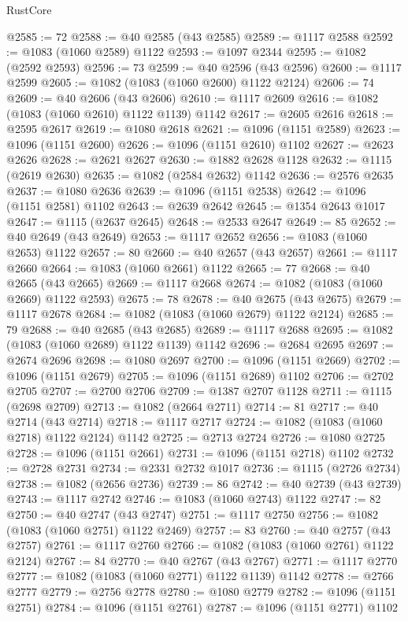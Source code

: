 \begin{lexlean}{RustCore}
\begin{coremodule}
@2585 := 72
@2588 := @40 @2585 (@43 @2585)
@2589 := @1117 @2588
@2592 := @1083 (@1060 @2589) @1122
@2593 := @1097 @2344
@2595 := @1082 (@2592 @2593)
@2596 := 73
@2599 := @40 @2596 (@43 @2596)
@2600 := @1117 @2599
@2605 := @1082 (@1083 (@1060 @2600) @1122 @2124)
@2606 := 74
@2609 := @40 @2606 (@43 @2606)
@2610 := @1117 @2609
@2616 := @1082 (@1083 (@1060 @2610) @1122 @1139) @1142
@2617 := @2605 @2616
@2618 := @2595 @2617
@2619 := @1080 @2618
@2621 := @1096 (@1151 @2589)
@2623 := @1096 (@1151 @2600)
@2626 := @1096 (@1151 @2610) @1102
@2627 := @2623 @2626
@2628 := @2621 @2627
@2630 := @1882 @2628 @1128
@2632 := @1115 (@2619 @2630)
@2635 := @1082 (@2584 @2632) @1142
@2636 := @2576 @2635
@2637 := @1080 @2636
@2639 := @1096 (@1151 @2538)
@2642 := @1096 (@1151 @2581) @1102
@2643 := @2639 @2642
@2645 := @1354 @2643 @1017
@2647 := @1115 (@2637 @2645)
@2648 := @2533 @2647
@2649 := 85
@2652 := @40 @2649 (@43 @2649)
@2653 := @1117 @2652
@2656 := @1083 (@1060 @2653) @1122
@2657 := 80
@2660 := @40 @2657 (@43 @2657)
@2661 := @1117 @2660
@2664 := @1083 (@1060 @2661) @1122
@2665 := 77
@2668 := @40 @2665 (@43 @2665)
@2669 := @1117 @2668
@2674 := @1082 (@1083 (@1060 @2669) @1122 @2593)
@2675 := 78
@2678 := @40 @2675 (@43 @2675)
@2679 := @1117 @2678
@2684 := @1082 (@1083 (@1060 @2679) @1122 @2124)
@2685 := 79
@2688 := @40 @2685 (@43 @2685)
@2689 := @1117 @2688
@2695 := @1082 (@1083 (@1060 @2689) @1122 @1139) @1142
@2696 := @2684 @2695
@2697 := @2674 @2696
@2698 := @1080 @2697
@2700 := @1096 (@1151 @2669)
@2702 := @1096 (@1151 @2679)
@2705 := @1096 (@1151 @2689) @1102
@2706 := @2702 @2705
@2707 := @2700 @2706
@2709 := @1387 @2707 @1128
@2711 := @1115 (@2698 @2709)
@2713 := @1082 (@2664 @2711)
@2714 := 81
@2717 := @40 @2714 (@43 @2714)
@2718 := @1117 @2717
@2724 := @1082 (@1083 (@1060 @2718) @1122 @2124) @1142
@2725 := @2713 @2724
@2726 := @1080 @2725
@2728 := @1096 (@1151 @2661)
@2731 := @1096 (@1151 @2718) @1102
@2732 := @2728 @2731
@2734 := @2331 @2732 @1017
@2736 := @1115 (@2726 @2734)
@2738 := @1082 (@2656 @2736)
@2739 := 86
@2742 := @40 @2739 (@43 @2739)
@2743 := @1117 @2742
@2746 := @1083 (@1060 @2743) @1122
@2747 := 82
@2750 := @40 @2747 (@43 @2747)
@2751 := @1117 @2750
@2756 := @1082 (@1083 (@1060 @2751) @1122 @2469)
@2757 := 83
@2760 := @40 @2757 (@43 @2757)
@2761 := @1117 @2760
@2766 := @1082 (@1083 (@1060 @2761) @1122 @2124)
@2767 := 84
@2770 := @40 @2767 (@43 @2767)
@2771 := @1117 @2770
@2777 := @1082 (@1083 (@1060 @2771) @1122 @1139) @1142
@2778 := @2766 @2777
@2779 := @2756 @2778
@2780 := @1080 @2779
@2782 := @1096 (@1151 @2751)
@2784 := @1096 (@1151 @2761)
@2787 := @1096 (@1151 @2771) @1102

\end{coremodule}
\end{lexlean}

